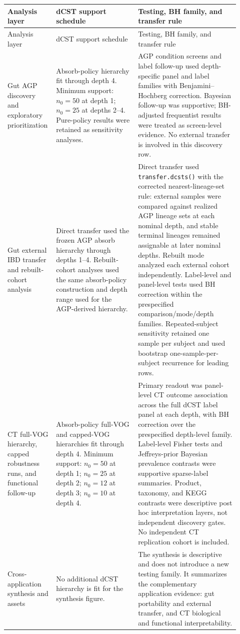 \begin{landscape}
\begin{longtable}{p{0.16\linewidth}p{0.34\linewidth}p{0.42\linewidth}}
\toprule
Analysis layer & dCST support schedule & Testing, BH family, and transfer rule \\
\midrule
\endfirsthead
\toprule
Analysis layer & dCST support schedule & Testing, BH family, and transfer rule \\
\midrule
\endhead
\bottomrule
\endfoot
Gut AGP discovery and exploratory prioritization &
Absorb-policy hierarchy fit through depth 4. Minimum support: \(n_0=50\) at depth 1; \(n_0=25\) at depths 2--4. Pure-policy results were retained as sensitivity analyses. &
AGP condition screens and label follow-up used depth-specific panel and label families with Benjamini--Hochberg correction. Bayesian follow-up was supportive; BH-adjusted frequentist results were treated as screen-level evidence. No external transfer is involved in this discovery row. \\
\midrule
Gut external IBD transfer and rebuilt-cohort analysis &
Direct transfer used the frozen AGP absorb hierarchy through depths 1--4. Rebuilt-cohort analyses used the same absorb-policy construction and depth range used for the AGP-derived hierarchy. &
Direct transfer used \texttt{transfer.dcsts()} with the corrected nearest-lineage-set rule: external samples were compared against realized AGP lineage sets at each nominal depth, and stable terminal lineages remained assignable at later nominal depths. Rebuilt mode analyzed each external cohort independently. Label-level and panel-level tests used BH correction within the prespecified comparison/mode/depth families. Repeated-subject sensitivity retained one sample per subject and used bootstrap one-sample-per-subject recurrence for leading rows. \\
\midrule
CT full-VOG hierarchy, capped robustness runs, and functional follow-up &
Absorb-policy full-VOG and capped-VOG hierarchies fit through depth 4. Minimum support: \(n_0=50\) at depth 1; \(n_0=25\) at depth 2; \(n_0=12\) at depth 3; \(n_0=10\) at depth 4. &
Primary readout was panel-level CT outcome association across the full dCST label panel at each depth, with BH correction over the prespecified depth-level family. Label-level Fisher tests and Jeffreys-prior Bayesian prevalence contrasts were supportive sparse-label summaries. Product, taxonomy, and KEGG contrasts were descriptive post hoc interpretation layers, not independent discovery gates. No independent CT replication cohort is included. \\
\midrule
Cross-application synthesis and assets &
No additional dCST hierarchy is fit for the synthesis figure. &
The synthesis is descriptive and does not introduce a new testing family. It summarizes the complementary application evidence: gut portability and external transfer, and CT biological and functional interpretability. \\
\end{longtable}


\end{landscape}
